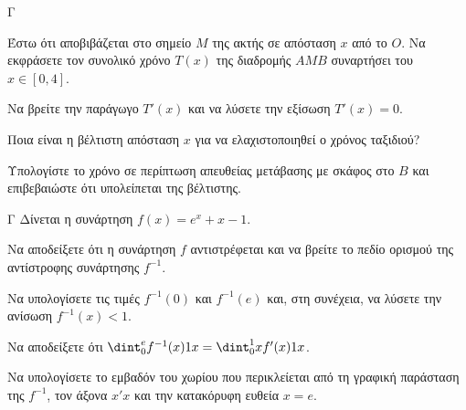 \begin{thema}{Γ}
\begin{center}
\end{center}
\begin{erwthma}
  \item Έστω ότι αποβιβάζεται στο σημείο $M$ της ακτής σε απόσταση $x$ από το $O$. Να εκφράσετε τον συνολικό χρόνο $T(x)$ της διαδρομής $AMB$ συναρτήσει του $x \in [0, 4]$.
  \item Να βρείτε την παράγωγο $T'(x)$ και να λύσετε την εξίσωση $T'(x)=0$.
  \item Ποια είναι η βέλτιστη απόσταση $x$ για να ελαχιστοποιηθεί ο χρόνος ταξιδιού? 
  \item Υπολογίστε το χρόνο σε περίπτωση απευθείας μετάβασης με σκάφος στο $B$ και επιβεβαιώστε ότι υπολείπεται της βέλτιστης.
\end{erwthma}
\end{thema}

\begin{thema}{Γ}
Δίνεται η συνάρτηση $f(x) = e^x + x - 1$.
\begin{erwthma}
  \item Να αποδείξετε ότι η συνάρτηση $f$ αντιστρέφεται και να βρείτε το πεδίο ορισμού της αντίστροφης συνάρτησης $f^{-1}$.
  \item Να υπολογίσετε τις τιμές $f^{-1}(0)$ και $f^{-1}(e)$ και, στη συνέχεια, να λύσετε την ανίσωση $f^{-1}(x) < 1$.
  \item Να αποδείξετε ότι $\dint_0^e f^{-1}(x) \d x = \dint_0^1 x f'(x) \d x$.
  \item Να υπολογίσετε το εμβαδόν του χωρίου που περικλείεται από τη γραφική παράσταση της $f^{-1}$, τον άξονα $x'x$ και την κατακόρυφη ευθεία $x = e$.
\end{erwthma}
\end{thema}

